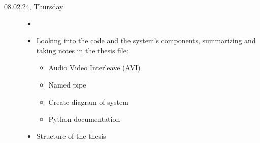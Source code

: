 \documentclass[a4, 11pt]{scrartcl}
\begin{document}
\begin{description}










\item[08.02.24, Thursday]
\begin{itemize}
	\item[]
	\item Looking into the code and the system's components, summarizing and taking notes in the thesis file:
	\begin{itemize}
		\item Audio Video Interleave (AVI)
		\item Named pipe
		\item Create diagram of system
		\item Python documentation
	\end{itemize}
	\item Structure of the thesis
\end{itemize}











		
		
\end{description}
	
	
	
	
	
	
\end{document}
